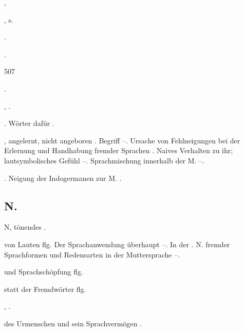 \begin{register}
,  

, s. 

 \pageref{sp.107}.

 \pageref{sp.182}.


{\textbar}{\textbar}507{\textbar}{\textbar}


 \pageref{sp.103}.

 \pageref{sp.358}, \pageref{sp.423}.

. Wörter dafür \pageref{sp.153}.

, angelernt, nicht angeboren \pageref{sp.61}. Begriff \pageref{sp.62}–\pageref{sp.63}.  Ursache von Fehlneigungen bei der Erlernung und Handhabung fremder Sprachen \pageref{sp.71}\sed{, \pageref{sp.120}}. Naives Verhalten zu ihr; lautsymbolisches Gefühl \pageref{sp.218}–\pageref{sp.225}. Sprachmischung innerhalb der M. \pageref{sp.273}–\pageref{sp.277}.

. Neigung der Indogermanen zur M. \pageref{sp.447}.

\subsection*{N.}\label{reg.N}

N, tönendes \pageref{sp.186}.

 von Lauten \pageref{sp.36} flg. Der Sprachanwendung überhaupt \pageref{sp.104}–\pageref{sp.105}. In der  \pageref{sp.105}. N. fremder Sprachformen und Redensarten in der Muttersprache \pageref{sp.270}–\pageref{sp.272}.

 und Sprachschöpfung \pageref{sp.308} flg.


 statt der Fremdwörter \pageref{sp.262} flg.

 \pageref{sp.149}, \pageref{sp.257}.

 des Urmenschen und sein Sprachvermögen \pageref{sp.304}.


\end{register}
